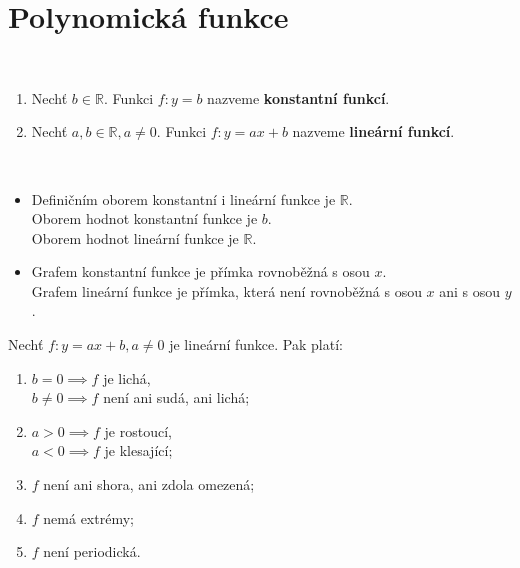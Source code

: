 \section{Polynomická funkce}

\begin{definition}\,
\begin{enumerate}[$i.$]
  \item Nechť $b \in \mathbb R$. Funkci $f:y = b$ nazveme \textbf{konstantní funkcí}.
  \item Nechť $a, b \in \mathbb R, a \neq 0$. Funkci $f:y= ax + b$ nazveme \textbf{lineární funkcí}.
\end{enumerate}
\end{definition}

\begin{pozn}\,
  \begin{itemize}
    \item Definičním oborem konstantní i lineární funkce je $\mathbb R$. \\
          Oborem hodnot konstantní funkce je ${b}$.\\
          Oborem hodnot lineární funkce je $\mathbb R$.
    \item Grafem konstantní funkce je přímka rovnoběžná s osou $x$. \\
          Grafem lineární funkce je přímka, která není rovnoběžná s osou $x$ ani s osou $y$.
  \end{itemize}
\end{pozn}

\begin{veta}
  Nechť $f: y = ax + b, a \neq 0$ je lineární funkce. Pak platí:
  \begin{enumerate}[$i.$]
    \item $b=0 \implies f$ je lichá,\\
          $b \neq 0 \implies f$ není ani sudá, ani lichá;
    \item $a > 0 \implies f$ je rostoucí,\\
          $a < 0 \implies f$ je klesající;
    \item $f$ není ani shora, ani zdola omezená;
    \item $f$ nemá extrémy;
    \item $f$ není periodická.
  \end{enumerate}
\end{veta}

